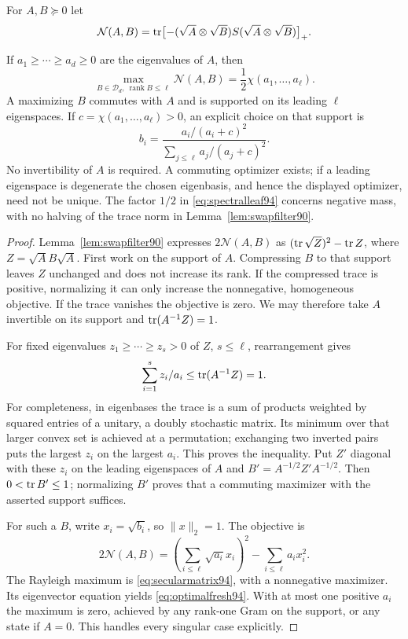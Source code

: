 For $A,B\succeq0$ let
\[
 \mathcal N(A,B)=\operatorname{tr}\bigl[-(\sqrt A\otimes\sqrt B)S
                                  (\sqrt A\otimes\sqrt B)\bigr]_+.
\]
\begin{lemma}
\label{lem:spectralleaf94}
If $a_1\ge\cdots\ge a_d\ge0$ are the eigenvalues of $A$, then
\begin{equation}\label{eq:spectralleaf94}
 \max_{B\in\mathcal D_d,\ \operatorname{rank}B\le\ell}
                  \mathcal N(A,B)
           =\frac12\chi(a_1,\ldots,a_\ell).
\end{equation}
A maximizing $B$ commutes with $A$ and is supported on its leading
$\ell$ eigenspaces.  If $c=\chi(a_1,\ldots,a_\ell)>0$, an explicit
choice on that support is
\begin{equation}\label{eq:optimalfresh94}
 b_i=\frac{a_i/(a_i+c)^2}{\sum_{j\le\ell}a_j/(a_j+c)^2}.
\end{equation}
No invertibility of $A$ is required.  A commuting optimizer exists;
if a leading eigenspace is degenerate the chosen eigenbasis, and hence
the displayed optimizer, need not be unique.  The factor $1/2$ in
\eqref{eq:spectralleaf94} concerns negative mass, with no halving of
the trace norm in Lemma~\ref{lem:swapfilter90}.
\end{lemma}
\begin{proof}
Lemma~\ref{lem:swapfilter90} expresses $2\mathcal N(A,B)$ as
$(\operatorname{tr}\sqrt Z)^2-\operatorname{tr} Z$, where $Z=\sqrt A B\sqrt A$.
First work on the support of $A$.  Compressing $B$ to that support
leaves $Z$ unchanged and does not increase its rank.  If the compressed
trace is positive, normalizing it can only increase the nonnegative,
homogeneous objective.  If the trace vanishes the objective is zero.
We may therefore take $A$ invertible on its support and
$\operatorname{tr}(A^{-1}Z)=1$.

For fixed eigenvalues $z_1\ge\cdots\ge z_s>0$ of $Z$, $s\le\ell$,
rearrangement gives
\[
                  \sum_{i=1}^s z_i/a_i\le\operatorname{tr}(A^{-1}Z)=1.
\]
For completeness, in eigenbases the trace is a sum of products weighted
by squared entries of a unitary, a doubly stochastic matrix.  Its
minimum over that larger convex set is achieved at a permutation;
exchanging two inverted pairs puts the largest $z_i$ on the largest
$a_i$.  This proves the inequality.  Put $Z'$ diagonal with these
$z_i$ on the leading eigenspaces of $A$ and
$B'=A^{-1/2}Z'A^{-1/2}$.  Then $0<\operatorname{tr} B'\le1$;
normalizing $B'$ proves that a commuting maximizer with the asserted
support suffices.

For such a $B$, write $x_i=\sqrt{b_i}$, so $\|x\|_2=1$.  The objective
is
\[
 2\mathcal N(A,B)
       =\left(\sum_{i\le\ell}\sqrt{a_i}x_i\right)^2
                          -\sum_{i\le\ell}a_ix_i^2.
\]
The Rayleigh maximum is \eqref{eq:secularmatrix94}, with a nonnegative
maximizer.  Its eigenvector equation yields
\eqref{eq:optimalfresh94}.  With at most one positive $a_i$ the maximum
is zero, achieved by any rank-one Gram on the support, or any state if
$A=0$.  This handles every singular case explicitly.
\end{proof}

